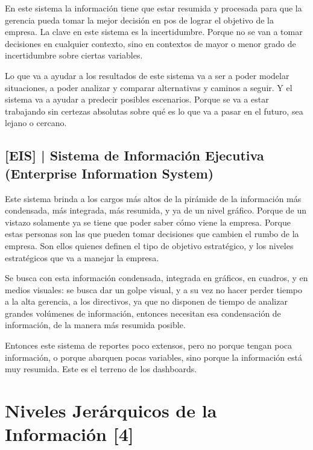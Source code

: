 En este sistema la información tiene que estar resumida y procesada para
que la gerencia pueda tomar la mejor decisión en pos de lograr el
objetivo de la empresa. La clave en este sistema es la incertidumbre.
Porque no se van a tomar decisiones en cualquier contexto, sino en
contextos de mayor o menor grado de incertidumbre sobre ciertas
variables.

Lo que va a ayudar a los resultados de este sistema va a ser a poder
modelar situaciones, a poder analizar y comparar alternativas y caminos
a seguir. Y el sistema va a ayudar a predecir posibles escenarios.
Porque se va a estar trabajando sin certezas absolutas sobre qué es lo
que va a pasar en el futuro, sea lejano o cercano.

\hypertarget{sistema-de-informaciuxf3n-ejecutiva}{%
\subsection{%
{[}EIS{]} |
Sistema de Información Ejecutiva
(Enterprise Information System)
}\label{sistema-de-informaciuxf3n-ejecutiva}}

Este sistema brinda a los cargos más altos de la pirámide de la
información más condensada, más integrada, más resumida, y ya de un
nivel gráfico. Porque de un vistazo solamente ya se tiene que poder
saber cómo viene la empresa. Porque estas personas son las que pueden
tomar decisiones que cambien el rumbo de la empresa. Son ellos quienes
definen el tipo de objetivo estratégico, y los niveles estratégicos que
va a manejar la empresa.

Se busca con esta información condensada, integrada en gráficos, en
cuadros, y en medios visuales: se busca dar un golpe visual, y a su vez
no hacer perder tiempo a la alta gerencia, a los directivos, ya que no
disponen de tiempo de analizar grandes volúmenes de información,
entonces necesitan esa condensación de información, de la manera más
resumida posible.

Entonces este sistema de reportes poco extensos, pero no porque tengan
poca información, o porque abarquen pocas variables, sino porque la
información está muy resumida. Este es el terreno de los dashboards.


\hypertarget{niveles-jeruxe1rquicos-de-la-informaciuxf3n}{%
\section{Niveles Jerárquicos de la
Información [4]}\label{niveles-jeruxe1rquicos-de-la-informaciuxf3n}}

